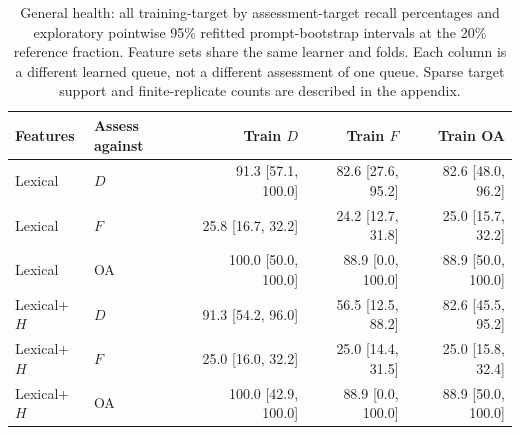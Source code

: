 \begin{table}[htbp]
\centering\small
\caption{General health: all training-target by assessment-target recall percentages and exploratory pointwise 95\% refitted prompt-bootstrap intervals at the 20\% reference fraction. Feature sets share the same learner and folds. Each column is a different learned queue, not a different assessment of one queue. Sparse target support and finite-replicate counts are described in the appendix.}
\label{tab:transferhealth}
\begin{tabular}{llrrr}
\toprule
Features & Assess against & Train $D$ & Train $F$ & Train OA \\
\midrule
Lexical & $D$ & 91.3 [57.1, 100.0] & 82.6 [27.6, 95.2] & 82.6 [48.0, 96.2] \\
Lexical & $F$ & 25.8 [16.7, 32.2] & 24.2 [12.7, 31.8] & 25.0 [15.7, 32.2] \\
Lexical & OA & 100.0 [50.0, 100.0] & 88.9 [0.0, 100.0] & 88.9 [50.0, 100.0] \\
Lexical+$H$ & $D$ & 91.3 [54.2, 96.0] & 56.5 [12.5, 88.2] & 82.6 [45.5, 95.2] \\
Lexical+$H$ & $F$ & 25.0 [16.0, 32.2] & 25.0 [14.4, 31.5] & 25.0 [15.8, 32.4] \\
Lexical+$H$ & OA & 100.0 [42.9, 100.0] & 88.9 [0.0, 100.0] & 88.9 [50.0, 100.0] \\
\bottomrule
\end{tabular}
\end{table}

